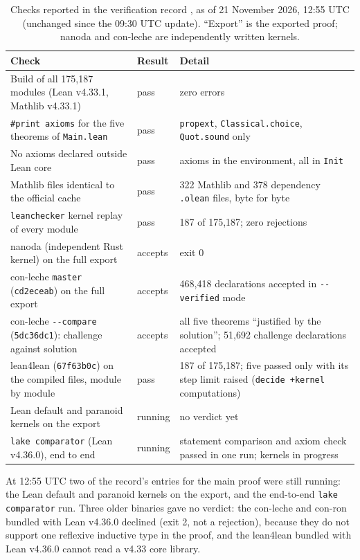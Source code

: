 \begin{table}[ht]
\centering\small
\renewcommand{\arraystretch}{1.25}
\caption{Checks reported in the verification record \cite{sutherland-1255}, as of 21 November 2026,
12:55 UTC (unchanged since the 09:30 UTC update). ``Export'' is the exported proof; nanoda and
con-leche are independently written kernels.}\label{tab:verification}
\begin{tabularx}{\linewidth}{@{}>{\raggedright\arraybackslash}X l >{\raggedright\arraybackslash}X@{}}
\toprule
Check & Result & Detail\\
\midrule
Build of all 175{,}187 modules (Lean v4.33.1, Mathlib v4.33.1) & pass & zero errors\\
\texttt{\#print axioms} for the five theorems of \texttt{Main.lean} & pass & \texttt{propext},
  \texttt{Classical.choice}, \texttt{Quot.sound} only\\
No axioms declared outside Lean core & pass & 15 axioms in the environment, all in \texttt{Init}\\
Mathlib files identical to the official cache & pass & 8{,}322 Mathlib and 378 dependency
  \texttt{.olean} files, byte for byte\\
\texttt{leanchecker} kernel replay of every module & pass & 175{,}187 of 175{,}187; zero rejections\\
nanoda (independent Rust kernel) on the full export & accepts & exit 0\\
con-leche \texttt{master} (\texttt{cd2eceab}) on the full export & accepts & 1{,}468{,}418
  declarations accepted in \texttt{-{}-verified} mode\\
con-leche \texttt{-{}-compare} (\texttt{5dc36dc1}): challenge against solution & accepts & all five
  theorems ``justified by the solution''; 51{,}692 challenge declarations accepted\\
lean4lean (\texttt{67f63b0c}) on the compiled files, module by module & pass & 175{,}187 of
  175{,}187; five passed only with its step limit raised (\texttt{decide +kernel} computations)\\
Lean default and paranoid kernels on the export & running & no verdict yet\\
\texttt{lake comparator} (Lean v4.36.0), end to end & running & statement comparison and axiom
  check passed in one run; kernels in progress\\
\bottomrule
\end{tabularx}
\end{table}

At 12:55 UTC two of the record's entries for the main proof were still running: the Lean default
and paranoid kernels on the export, and the end-to-end \texttt{lake comparator} run. Three older
binaries gave no verdict: the con-leche and con-ron bundled with Lean v4.36.0 declined (exit 2, not
a rejection), because they do not support one reflexive inductive type in the proof, and the
lean4lean bundled with Lean v4.36.0 cannot read a v4.33 core library.

